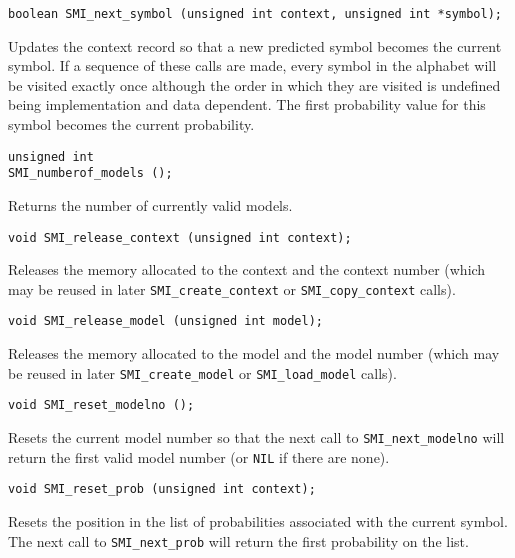 \documentclass[11pt]{article}
\begin{document}
{\begin{verbatim}
boolean SMI_next_symbol (unsigned int context, unsigned int *symbol);
\end{verbatim}

\vspace{-0.2cm}
Updates the context record so that a new predicted symbol becomes the
current symbol. If a sequence of these calls are made, every symbol in the
alphabet will be visited exactly once although the order in which they are
visited is undefined being implementation and data dependent. The first
probability value for this symbol becomes the current probability.

\begin{verbatim}
unsigned int
SMI_numberof_models ();
\end{verbatim}

\vspace{-0.2cm}
Returns the number of currently valid models.

\begin{verbatim}
void SMI_release_context (unsigned int context);
\end{verbatim}

\vspace{-0.2cm}
Releases the memory allocated to the context and the context number (which may
be reused in later \verb|SMI_create_context| or \verb|SMI_copy_context| calls).

\begin{verbatim}
void SMI_release_model (unsigned int model);
\end{verbatim}

\vspace{-0.2cm}
Releases the memory allocated to the model and the model number (which may
be reused in later \verb|SMI_create_model| or \verb|SMI_load_model|
calls).

\begin{verbatim}
void SMI_reset_modelno ();
\end{verbatim}

\vspace{-0.2cm}
Resets the current model number so that the next call to
\verb|SMI_next_modelno| will return the first valid model number (or
\verb|NIL| if there are none).

\begin{verbatim}
void SMI_reset_prob (unsigned int context);
\end{verbatim}

\vspace{-0.2cm}
Resets the position in the list of probabilities associated with the current symbol.
The next call to \verb|SMI_next_prob| will return the first probability on the list.

}
\end{document}
